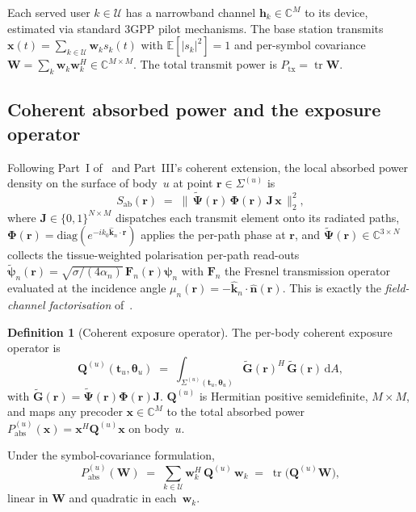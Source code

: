 \documentclass[journal,twoside,onecolumn]{IEEEtran}
\theoremstyle{definition}
\newtheorem{definition}[theorem]{Definition}
\newcommand{\khat}{\hat{\bm{k}}}
\newcommand{\nhat}{\hat{\bm{n}}}
\newcommand{\rr}{\mathbf{r}}
\newcommand{\xx}{\mathbf{x}}
\newcommand{\ww}{\mathbf{w}}
\newcommand{\hh}{\mathbf{h}}
\newcommand{\Sab}{S_{\mathrm{ab}}}
\newcommand{\Pabs}{P_{\mathrm{abs}}}
\newcommand{\Ptx}{P_{\mathrm{tx}}}
\newcommand{\Q}{\mathbf{Q}}
\newcommand{\Jmat}{\mathbf{J}}
\newcommand{\Phimat}{\mathbf{\Phi}}
\newcommand{\Psitil}{\tilde{\bm{\Psi}}}
\newcommand{\Gtil}{\tilde{\mathbf{G}}}
\newcommand{\Wcov}{\mathbf{W}}
\newcommand{\Complex}{\mathbb{C}}
\newcommand{\Users}{\mathcal{U}}
\DeclareMathOperator{\tr}{tr}
\begin{document}
Each served user $k\in\Users$ has a narrowband channel
$\hh_k\in\Complex^M$ to its device, estimated via standard 3GPP
pilot mechanisms. The base station transmits
$\xx(t)=\sum_{k\in\Users}\ww_k s_k(t)$ with $\mathbb{E}[|s_k|^2]=1$
and per-symbol covariance
$\Wcov=\sum_k\ww_k\ww_k^H\in\Complex^{M\times M}$. The total
transmit power is
$\Ptx=\tr\Wcov$.

\subsection{Coherent absorbed power and the exposure operator}

Following Part~I of~\cite{WydaegheMonograph} and
Part~III's coherent extension, the local absorbed power density on
the surface of body~$u$ at point $\rr\in\Sigma^{(u)}$ is
\begin{equation}\label{eq:Sab-local}
  \Sab(\rr)
  \;=\;\bigl\|\,\Psitil(\rr)\,\Phimat(\rr)\,\Jmat\,\xx\,\bigr\|_2^2,
\end{equation}
where $\Jmat\in\{0,1\}^{N\times M}$ dispatches each transmit
element onto its radiated paths, $\Phimat(\rr)=\mathrm{diag}(e^{-ik_0\khat_n\cdot\rr})$
applies the per-path phase at $\rr$, and
$\Psitil(\rr)\in\Complex^{3\times N}$ collects the tissue-weighted
polarisation per-path read-outs
$\tilde{\bm\psi}_n(\rr)=\sqrt{\sigma/(4\alpha_n)}\,\mathbf{F}_n(\rr)\bm\psi_n$
with $\mathbf{F}_n$ the Fresnel transmission operator evaluated at
the incidence angle $\mu_n(\rr)=-\khat_n\cdot\nhat(\rr)$. This is
exactly the \emph{field-channel factorisation} of~\cite{SystemFormalism}.

\begin{definition}[Coherent exposure operator]\label{def:Q}
The per-body coherent exposure operator is
\begin{equation}\label{eq:Q-def}
  \Q^{(u)}(\mathbf{t}_u,\bm\theta_u)
  \;=\;\int_{\Sigma^{(u)}(\mathbf{t}_u,\bm\theta_u)}
    \Gtil(\rr)^H\,\Gtil(\rr)\,\mathrm{d}A,
\end{equation}
with $\Gtil(\rr)=\Psitil(\rr)\Phimat(\rr)\Jmat$. $\Q^{(u)}$ is
Hermitian positive semidefinite, $M{\times}M$, and maps any
precoder $\xx\in\Complex^M$ to the total absorbed power
$\Pabs^{(u)}(\xx)=\xx^H\Q^{(u)}\xx$ on body~$u$.
\end{definition}

Under the symbol-covariance formulation,
\begin{equation}\label{eq:Pabs-W}
  \Pabs^{(u)}(\Wcov)\;=\;\sum_{k\in\Users}\ww_k^H\,\Q^{(u)}\,\ww_k
  \;=\;\tr\!\bigl(\Q^{(u)}\Wcov\bigr),
\end{equation}
linear in $\Wcov$ and quadratic in each~$\ww_k$.
\end{document}

